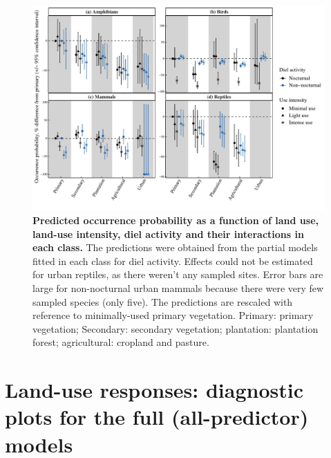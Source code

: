 \documentclass[11pt]{article}
\begin{document}
\begin{figure}[h!]
\centering
\includegraphics[scale=0.7]{Figures/Partial_models_predictions/Diel_activity}
\caption[]{\textbf{Predicted occurrence probability as a function of land use, land-use intensity, diel activity and their interactions in each class.} The predictions were obtained from the partial models fitted in each class for diel activity. Effects could not be estimated for urban reptiles, as there weren't any sampled sites. Error bars are large for non-nocturnal urban mammals because there were very few sampled species (only five). The predictions are rescaled with reference to minimally-used primary vegetation. Primary: primary vegetation; Secondary: secondary vegetation; plantation: plantation forest; agricultural: cropland and pasture.}
\label{}
\end{figure}


\clearpage
\section{Land-use responses: diagnostic plots for the full (all-predictor) models} 
\end{document}
